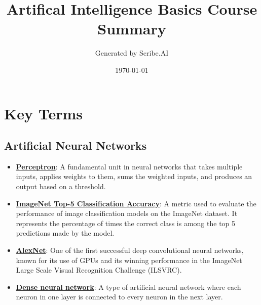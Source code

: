 \documentclass{article}%
\title{Artifical Intelligence Basics Course Summary}%
\author{Generated by Scribe.AI}%
\date{\today}%
\begin{document}
%
\normalsize%
\maketitle%
\section{Key Terms}%
\label{sec:KeyTerms}%
\subsection{Artificial Neural Networks}%
\label{subsec:ArtificialNeuralNetworks}%
\begin{itemize}[leftmargin=*]%
\item \href{https://purdue.brightspace.com/d2l/common/assets/pdfjs-d2l-dist/1.0.14-legacy/web/viewer.html?file=\%2Fcontent\%2Fenforced\%2F1095467-wl.202510.CS.24300.001\%2F02L2-Intro.pdf\%3Fou\%3D1095467\&lang=en-us\&container=d2l-fileviewer-rendered-pdf\&fullscreen=d2l-fileviewer-rendered-pdf-dialog\&height=667#page=45}{\textbf{Perceptron}}: A fundamental unit in neural networks that takes multiple inputs, applies weights to them, sums the weighted inputs, and produces an output based on a threshold.%
\item \href{https://purdue.brightspace.com/d2l/common/assets/pdfjs-d2l-dist/1.0.14-legacy/web/viewer.html?file=\%2Fcontent\%2Fenforced\%2F1095467-wl.202510.CS.24300.001\%2F09L1-cnn.pdf\%3Fou\%3D1095467\&lang=en-us\&container=d2l-fileviewer-rendered-pdf\&fullscreen=d2l-fileviewer-rendered-pdf-dialog\&height=667#page=3}{\textbf{ImageNet Top-5 Classification Accuracy}}: A metric used to evaluate the performance of image classification models on the ImageNet dataset. It represents the percentage of times the correct class is among the top 5 predictions made by the model.%
\item \href{https://purdue.brightspace.com/d2l/common/assets/pdfjs-d2l-dist/1.0.14-legacy/web/viewer.html?file=\%2Fcontent\%2Fenforced\%2F1095467-wl.202510.CS.24300.001\%2F09L1-cnn.pdf\%3Fou\%3D1095467\&lang=en-us\&container=d2l-fileviewer-rendered-pdf\&fullscreen=d2l-fileviewer-rendered-pdf-dialog\&height=667#page=3}{\textbf{AlexNet}}: One of the first successful deep convolutional neural networks, known for its use of GPUs and its winning performance in the ImageNet Large Scale Visual Recognition Challenge (ILSVRC).%
\item \href{https://purdue.brightspace.com/d2l/common/assets/pdfjs-d2l-dist/1.0.14-legacy/web/viewer.html?file=\%2Fcontent\%2Fenforced\%2F1095467-wl.202510.CS.24300.001\%2F09L1-cnn.pdf\%3Fou\%3D1095467\&lang=en-us\&container=d2l-fileviewer-rendered-pdf\&fullscreen=d2l-fileviewer-rendered-pdf-dialog\&height=667#page=4}{\textbf{Dense neural network}}: A type of artificial neural network where each neuron in one layer is connected to every neuron in the next layer.%

\end{itemize}
\end{document}
